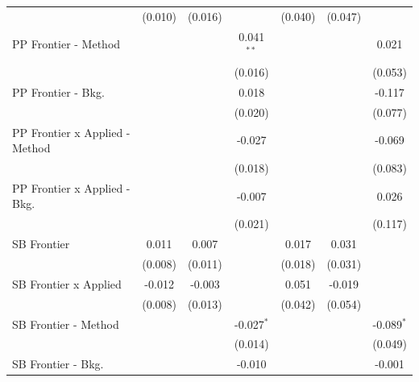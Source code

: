 \begin{tabular}{lcccccc}
                                  & (0.010)       & (0.016)       &               & (0.040)       & (0.047)        &   \\   
   PP Frontier - Method           &               &               & 0.041$^{**}$  &               &                & 0.021\\   
                                  &               &               & (0.016)       &               &                & (0.053)\\   
   PP Frontier - Bkg.             &               &               & 0.018         &               &                & -0.117\\   
                                  &               &               & (0.020)       &               &                & (0.077)\\   
   PP Frontier x Applied - Method &               &               & -0.027        &               &                & -0.069\\   
                                  &               &               & (0.018)       &               &                & (0.083)\\   
   PP Frontier x Applied - Bkg.   &               &               & -0.007        &               &                & 0.026\\   
                                  &               &               & (0.021)       &               &                & (0.117)\\   
   SB Frontier                    & 0.011         & 0.007         &               & 0.017         & 0.031          &   \\   
                                  & (0.008)       & (0.011)       &               & (0.018)       & (0.031)        &   \\   
   SB Frontier x Applied          & -0.012        & -0.003        &               & 0.051         & -0.019         &   \\   
                                  & (0.008)       & (0.013)       &               & (0.042)       & (0.054)        &   \\   
   SB Frontier - Method           &               &               & -0.027$^{*}$  &               &                & -0.089$^{*}$\\   
                                  &               &               & (0.014)       &               &                & (0.049)\\   
   SB Frontier - Bkg.             &               &               & -0.010        &               &                & -0.001\\   

\end{tabular}
